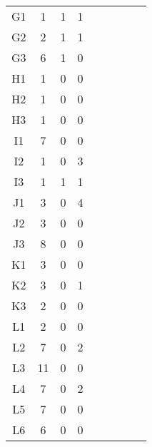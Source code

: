 \begin{center}
\begin{longtable}{ccccc|cccc}
G1    & 1     & 1     & 1 \\
G2    & 2     & 1     & 1 \\
G3    & 6     & 1     & 0 \\
H1    & 1     & 0     & 0 \\
H2    & 1     & 0     & 0 \\
H3    & 1     & 0     & 0 \\
I1    & 7     & 0     & 0 \\
I2    & 1     & 0     & 3 \\
I3    & 1     & 1     & 1 \\
J1    & 3     & 0     & 4 \\
J2    & 3     & 0     & 0 \\
J3    & 8     & 0     & 0 \\
K1    & 3     & 0     & 0 \\
K2    & 3     & 0     & 1 \\
K3    & 2     & 0     & 0 \\
L1    & 2     & 0     & 0 \\
L2    & 7     & 0     & 2 \\
L3    & 11    & 0     & 0 \\
L4    & 7     & 0     & 2 \\
L5    & 7     & 0     & 0 \\
L6    & 6     & 0     & 0 \\

\end{longtable}
\end{center}

